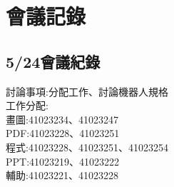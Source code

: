\chapter{會議記錄}


\section{5/24會議紀錄}


討論事項:分配工作、討論機器人規格\\


工作分配:\\
畫圖:41023234、41023247\\
PDF:41023228、41023251\\
程式:41023228、41023251、41023254\\
PPT:41023219、41023222\\
輔助:41023221、41023228\\


	